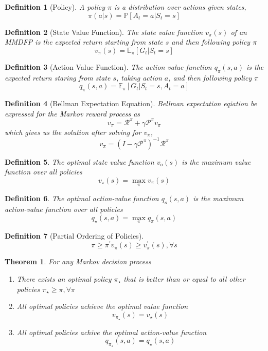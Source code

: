 \documentclass[a4paper,10pt]{article}
\newtheorem{defn}{Definition}
\newtheorem{theorem}{Theorem}
\begin{document}
\begin{defn}[Policy]
 A policy $\pi$ is a distribution over actions given states,
 $$
 \pi(a|s) = \mathbb{P} \left[ A_t = a | S_t = s \right]
 $$
\end{defn}

\begin{defn}[State Value Function]
 The state value function $v_\pi(s)$ of an MMDFP is the expected return starting from state $s$ and then following policy $\pi$
 $$
 v_\pi(s) = \mathbb{E}_\pi \left[ G_t | S_t = s \right]
 $$
\end{defn}

\begin{defn}[Action Value Function]
 The action value function $q_\pi(s,a)$ is the expected return staring from state $s$, taking action $a$, and then following policy $\pi$
 $$
 q_\pi(s,a) = \mathbb{E}_\pi \left[ G_t | S_t = s, A_t = a \right]
 $$
\end{defn}

\begin{defn}[Bellman Expectation Equation]
 Bellman expectation eqiation be expressed for the Markov reward process as
 $$
 v_\pi = \mathcal{R}^\pi + \gamma \mathcal{P}^\pi v_\pi
 $$
 which gives us the solution after solving for $v_\pi$, 
 $$
 v_\pi = \left(I - \gamma \mathcal{P}^\pi\right)^{-1} \mathcal{R}^\pi
 $$
\end{defn}

\begin{defn}
 The optimal state value function $v_o(s)$ is the maximum value function over all policies
 $$
 v_\star(s) = \max_\pi v_\pi(s)
 $$
\end{defn}

\begin{defn}
 The optimal action-value function $q_o(s,a)$ is the maximum action-value function over all policies
 $$
 q_\star(s,a) = \max_\pi q_\pi(s,a)
 $$
\end{defn}

\begin{defn}[Partial Ordering of Policies]
 $$
 \pi \geq \pi^\prime
 v_\pi(s) \geq v_\pi^\prime(s), \forall s
 $$
\end{defn}

\begin{theorem}
 For any Markov decision process
 \begin{enumerate}
  \item There exists an optimal policy $\pi_\star$ that is better than or equal to all other policies $\pi_\star \geq \pi, \forall \pi$
  \item All optimal policies achieve the optimal value function 
  $$
  v_{\pi_\star}(s) = v_\star(s)
  $$
  \item All optimal policies achive the optimal action-value function
  $$
  q_{\pi_\star}(s,a) = q_\star(s,a)
  $$
 \end{enumerate}

\end{theorem}
\end{document}
